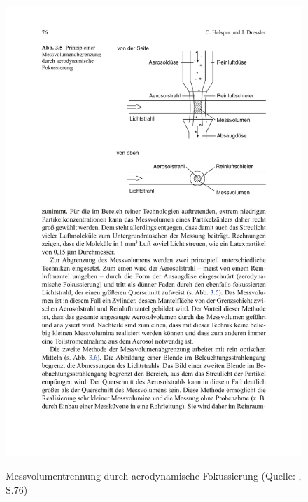 \begin{figure}[H]
	\myfloatalign
	{\includegraphics[width=.9\linewidth]{gfx/requirements/aerodynamisch_fokus.pdf}} \quad
	\caption[Messvolumentrennung durch aerodynamische Fokussierung (Quelle: \cite{reinraumtechnik}, S.76)]
	{Messvolumentrennung durch aerodynamische Fokussierung (Quelle: \cite{reinraumtechnik}, S.76)}
	\label{fig:aerodynamisch_trennung}
\end{figure}

